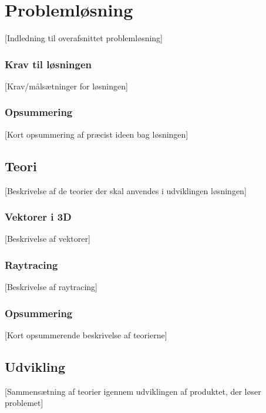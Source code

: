 \section{Problemløsning}

[Indledning til overafsnittet problemløsning]



\subsubsection{Krav til løsningen}

[Krav/målsætninger for løsningen]

\subsubsection*{Opsummering}

[Kort opsummering af præcist ideen bag løsningen]

\subsection{Teori}

[Beskrivelse af de teorier der skal anvendes i udviklingen løsningen]

\subsubsection{Vektorer i 3D}

[Beskrivelse af vektorer]

\subsubsection{Raytracing}

[Beskrivelse af raytracing]

\subsubsection*{Opsummering}

[Kort opsummerende beskrivelse af teorierne]

\subsection{Udvikling}

[Sammensætning af teorier igennem udviklingen af produktet, der løser problemet]

\clearpage